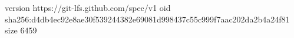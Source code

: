 version https://git-lfs.github.com/spec/v1
oid sha256:d4db4ec92e8ae30f539244382e69081d998437c55c999f7aac202da2b4a24f81
size 6459
